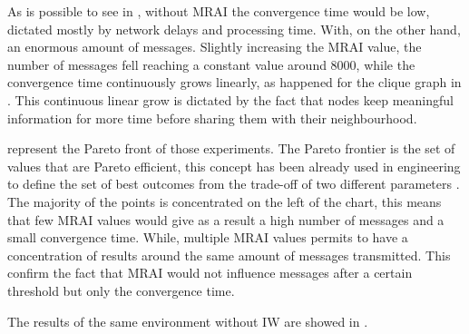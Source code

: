 As is possible to see in ,
without \ac{MRAI} the convergence time would be low, dictated mostly by
network delays and processing time. With, on the other hand, an enormous amount
of messages.
Slightly increasing the \ac{MRAI} value, the number of messages fell
reaching a constant value around \num{8000}, while the convergence time
continuously grows linearly, as happened for the clique graph in .
This continuous linear grow is dictated by the fact that nodes keep meaningful
information for more time before sharing them with their neighbourhood.

 represent the Pareto
front of those experiments.
The Pareto frontier is the set of values that are Pareto efficient, this concept
has been already used in engineering to define the set of best outcomes from
the trade-off of two different parameters \cite{goodarzi2014introduction}.
The majority of the points is concentrated on the left
of the chart, this means that few \ac{MRAI} values would give as a result
a high number of messages and a small convergence time.
While, multiple \ac{MRAI} values permits to have a concentration of results around the
same amount of messages transmitted.
This confirm the fact that \ac{MRAI} would not influence messages
after a certain threshold but only the convergence time.

The results of the same environment without \ac{IW} are showed in
.

